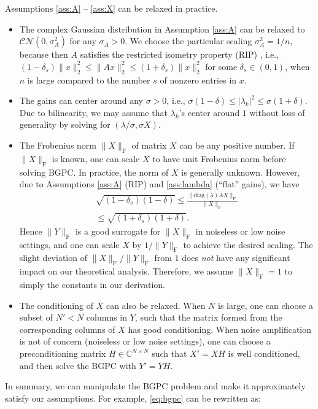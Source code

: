 \documentclass[11pt,journal]{IEEEtran}
\newcommand{\bbC}{\mathbb{C}}
\newcommand{\rmF}{\mathrm{F}}
\newcommand{\calCN}{\mathcal{CN}}
\newcommand{\norm}[1]{\|{#1}\|}
\newcommand{\diag}{\mathrm{diag}}
\begin{document}
Assumptions \ref{ass:A} -- \ref{ass:X} can be relaxed in practice.
\begin{itemize}
	\item The complex Gaussian distribution in Assumption \ref{ass:A} can be relaxed to $\calCN(0,\sigma_A^2)$ for any $\sigma_A>0$. We choose the particular scaling $\sigma_A^2 = 1/n$, because then $A$ satisfies the restricted isometry property (RIP) \cite{Candes2005}, i.e., $(1-\delta_s)\norm{x}_2^2\leq \norm{Ax}_2^2 \leq (1+\delta_s)\norm{x}_2^2$ for some $\delta_s\in(0,1)$, when $n$ is large compared to the number $s$ of nonzero entries in $x$. 
	\item The gains can center around any $\sigma >0$, i.e., $\sigma(1-\delta) \leq |\lambda_k|^2 \leq \sigma(1+\delta)$. Due to bilinearity, we may assume that $\lambda_k$'s center around $1$ without loss of generality by solving for $(\lambda/\sigma, \sigma X)$.
	\item The Frobenius norm $\norm{X}_\rmF$ of matrix $X$ can be any positive number. If $\norm{X}_\rmF$ is known, one can scale $X$ to have unit Frobenius norm before solving BGPC. In practice, the norm of $X$ is generally unknown. However, due to Assumptions \ref{ass:A} (RIP) and \ref{ass:lambda} (``flat'' gains), we have
	\begin{align*}
	\sqrt{(1-\delta_s)(1-\delta)}\leq \frac{\norm{\diag(\lambda)AX}_\rmF}{\norm{X}_\rmF} \\
	\leq \sqrt{(1+\delta_s)(1+\delta)}.
	\end{align*}
	Hence $\norm{Y}_\rmF$ is a good surrogate for $\norm{X}_\rmF$ in noiseless or low noise settings, and one can scale $X$ by $1/\norm{Y}_\rmF$ to achieve the desired scaling. The slight deviation of $\norm{X}_\rmF/\norm{Y}_\rmF$ from $1$ does \emph{not} have any significant impact on our theoretical analysis. Therefore, we assume $\norm{X}_\rmF = 1$ to simply the constants in our derivation.
	\item The conditioning of $X$ can also be relaxed. When $N$ is large, one can choose a subset of $N'<N$ columns in $Y$, such that the matrix formed from the corresponding columns of $X$ has good conditioning. When noise amplification is not of concern (noiseless or low noise settings), one can choose a preconditioning matrix $H\in\bbC^{N\times N}$ such that $X' = XH$ is well conditioned, and then solve the BGPC with $Y' = YH$.   
\end{itemize}
In summary, we can manipulate the BGPC problem and make it approximately satisfy our assumptions. For example, \eqref{eq:bgpc} can be rewritten as:
\end{document}
